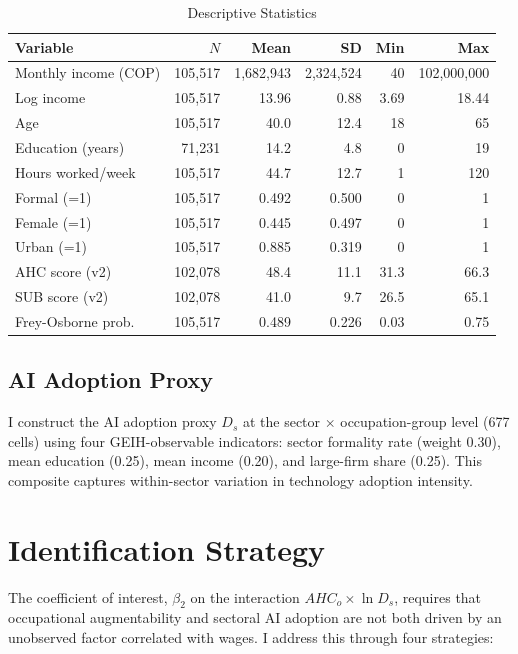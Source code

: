 \documentclass[11pt,a4paper]{article}
\theoremstyle{definition}
\begin{document}
\begin{table}[htbp]
\centering
\caption{Descriptive Statistics}
\label{tab:descriptives}
\begin{tabular}{lrrrrr}
\toprule
Variable & $N$ & Mean & SD & Min & Max \\
\midrule
Monthly income (COP) & 105,517 & 1,682,943 & 2,324,524 & 40 & 102,000,000 \\
Log income & 105,517 & 13.96 & 0.88 & 3.69 & 18.44 \\
Age & 105,517 & 40.0 & 12.4 & 18 & 65 \\
Education (years) & 71,231 & 14.2 & 4.8 & 0 & 19 \\
Hours worked/week & 105,517 & 44.7 & 12.7 & 1 & 120 \\
Formal (=1) & 105,517 & 0.492 & 0.500 & 0 & 1 \\
Female (=1) & 105,517 & 0.445 & 0.497 & 0 & 1 \\
Urban (=1) & 105,517 & 0.885 & 0.319 & 0 & 1 \\
\midrule
AHC score (v2) & 102,078 & 48.4 & 11.1 & 31.3 & 66.3 \\
SUB score (v2) & 102,078 & 41.0 & 9.7 & 26.5 & 65.1 \\
Frey-Osborne prob. & 105,517 & 0.489 & 0.226 & 0.03 & 0.75 \\
\bottomrule
\end{tabular}
\end{table}

\subsection{AI Adoption Proxy}

I construct the AI adoption proxy $D_s$ at the sector $\times$ occupation-group level (677 cells) using four GEIH-observable indicators: sector formality rate (weight 0.30), mean education (0.25), mean income (0.20), and large-firm share (0.25). This composite captures within-sector variation in technology adoption intensity.


\section{Identification Strategy}
\label{sec:identification}

The coefficient of interest, $\beta_2$ on the interaction $AHC_o \times \ln D_s$, requires that occupational augmentability and sectoral AI adoption are not both driven by an unobserved factor correlated with wages. I address this through four strategies:
\end{document}

